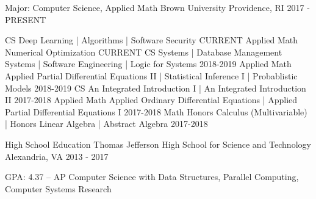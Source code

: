 \begin{cventries}
  \cventry
    {Major: Computer Science, Applied Math}
    {Brown University}
    {Providence, RI}
    {2017 - PRESENT}
    {
        \vspace{-2em}
        \begin{cvhonors}
			\cvhonor
			{CS}
			{Deep Learning | Algorithms | Software Security}
			{}
			{CURRENT}
			\cvhonor
			{Applied Math}
			{Numerical Optimization}
			{}
			{CURRENT}
			\cvhonor
			{CS}
			{Systems | Database Management Systems | Software Engineering | Logic for Systems}
			{}
			{2018-2019}
			\cvhonor
			{Applied Math}
            {Applied Partial Differential Equations II | Statistical Inference I | Probablistic Models}
			{}
			{2018-2019}
			\cvhonor
			{CS}
			{An Integrated Introduction I | An Integrated Introduction II}
			{}
			{2017-2018}
			\cvhonor
			{Applied Math}
			{Applied Ordinary Differential Equations | Applied Partial Differential Equations I}
			{}
			{2017-2018}
			\cvhonor
			{Math}
			{Honors Calculus (Multivariable) | Honors Linear Algebra | Abstract Algebra}
			{}
			{2017-2018}
        \end{cvhonors}
		\vspace{-1.25em}
    }
\end{cventries}

\begin{cventries}
  \cventry
    {High School Education}
    {Thomas Jefferson High School for Science and Technology}
    {Alexandria, VA}
    {2013 - 2017}
    {
      \begin{cvitems}
		\item {GPA: 4.37 -- AP Computer Science with Data Structures, Parallel Computing, Computer Systems Research}
      \end{cvitems}
    }
	\vspace{-1.0em}
\end{cventries}
